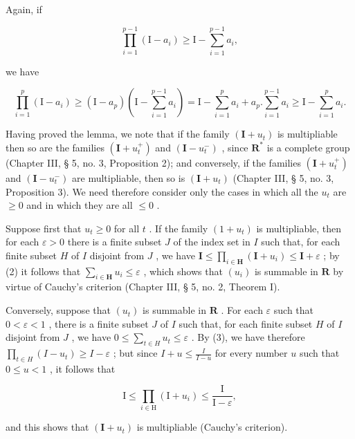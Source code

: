 Again, if

\[
\prod_ {i = 1} ^ {p - 1} \left(\mathrm{I} - a _ {i}\right) \geqslant \mathrm{I} - \sum_ {i = 1} ^ {p - 1} a _ {i},
\]

we have

\[
\prod_ {i = 1} ^ {p} \left(\mathrm{I} - a _ {i}\right) \geqslant \left(\mathrm{I} - a _ {p}\right) \left(\mathrm{I} - \sum_ {i = 1} ^ {p - 1} a _ {i}\right) = \mathrm{I} - \sum_ {i = 1} ^ {p} a _ {i} + a _ {p}. \sum_ {i = 1} ^ {p - 1} a _ {i} \geqslant \mathrm{I} - \sum_ {i = 1} ^ {p} a _ {i}.
\]

Having proved the lemma, we note that if the family \((\mathbf{I} + u_{t})\) is multipliable then so are the families \((\mathbf{I} + u_{t}^{+})\) and \((\mathbf{I} - u_{t}^{-})\) , since \(\mathbf{R}^*\) is a complete group (Chapter III, § 5, no. 3, Proposition 2); and conversely, if the families \((\mathbf{I} + u_{t}^{+})\) and \((\mathbf{I} - u_{t}^{-})\) are multipliable, then so is \((\mathbf{I} + u_{t})\) (Chapter III, § 5, no. 3, Proposition 3). We need therefore consider only the cases in which all the \(u_{t}\) are \(\geqslant 0\) and in which they are all \(\leqslant 0\) .

Suppose first that \(u_{t} \geqslant 0\) for all \(t\) . If the family \((1 + u_{t})\) is multipliable, then for each \(\varepsilon > 0\) there is a finite subset \(J\) of the index set in \(I\) such that, for each finite subset \(H\) of \(I\) disjoint from \(J\) , we have \(\mathbf{I} \leqslant \prod_{i \in \mathbf{H}} (\mathbf{I} + u_i) \leqslant \mathbf{I} + \varepsilon\) ; by (2) it follows that \(\sum_{i \in \mathbf{H}} u_i \leqslant \varepsilon\) , which shows that \((u_i)\) is summable in \(\mathbf{R}\) by virtue of Cauchy's criterion (Chapter III, § 5, no. 2, Theorem I).

Conversely, suppose that \((u_{t})\) is summable in \(\mathbf{R}\) . For each \(\varepsilon\) such that \(0 < \varepsilon < 1\) , there is a finite subset \(J\) of \(I\) such that, for each finite subset \(H\) of \(I\) disjoint from \(J\) , we have \(0 \leqslant \sum_{t \in H} u_{t} \leqslant \varepsilon\) . By (3), we have therefore \(\prod_{t \in H} (I - u_{t}) \geqslant I - \varepsilon\) ; but since \(I + u \leqslant \frac{I}{I - u}\) for every number \(u\) such that \(0 \leqslant u < 1\) , it follows that

\[
\mathrm{I} \leqslant \prod_ {i \in \mathrm{H}} (\mathrm{I} + u _ {i}) \leqslant \frac {\mathrm{I}}{\mathrm{I} - \varepsilon},
\]

and this shows that \((\mathbf{I} + u_{t})\) is multipliable (Cauchy's criterion).

